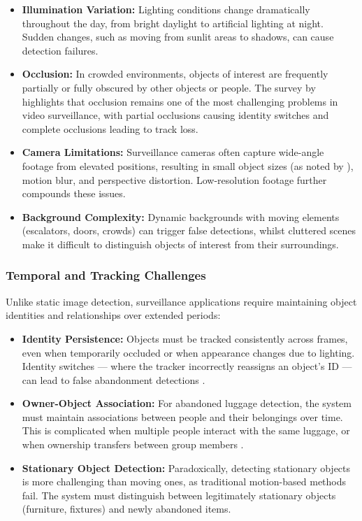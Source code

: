 \begin{itemize}
	\item \textbf{Illumination Variation:} Lighting conditions change
	      dramatically throughout the day, from bright daylight to artificial
	      lighting at night. Sudden changes, such as moving from sunlit areas to
	      shadows, can cause detection failures.
	\item \textbf{Occlusion:} In crowded environments, objects of interest are
	      frequently partially or fully obscured by other objects or people. The
	      survey by \citet{amrouch2024occlusion} highlights that occlusion
	      remains one of the most challenging problems in video surveillance,
	      with partial occlusions causing identity switches and complete
	      occlusions leading to track loss.
	\item \textbf{Camera Limitations:} Surveillance cameras often capture
	      wide-angle footage from elevated positions, resulting in small object
	      sizes (as noted by \citet{abandoned2025vrsalovic}), motion blur, and
	      perspective distortion. Low-resolution footage further compounds these
	      issues.
	\item \textbf{Background Complexity:} Dynamic backgrounds with moving
	      elements (escalators, doors, crowds) can trigger false detections,
	      whilst cluttered scenes make it difficult to distinguish objects of
	      interest from their surroundings.
\end{itemize}

\subsubsection{Temporal and Tracking Challenges}

Unlike static image detection, surveillance applications require maintaining
object identities and relationships over extended periods:

\begin{itemize}
	\item \textbf{Identity Persistence:} Objects must be tracked consistently
	      across frames, even when temporarily occluded or when appearance
	      changes due to lighting. Identity switches --- where the tracker
	      incorrectly reassigns an object's ID --- can lead to false abandonment
	      detections \citep{yilmaz2006object}.
	\item \textbf{Owner-Object Association:} For abandoned luggage detection,
	      the system must maintain associations between people and their
	      belongings over time. This is complicated when multiple people interact
	      with the same luggage, or when ownership transfers between group
	      members \citep{abandoned2025vrsalovic}.
	\item \textbf{Stationary Object Detection:} Paradoxically, detecting
	      stationary objects is more challenging than moving ones, as traditional
	      motion-based methods fail. The system must distinguish between
	      legitimately stationary objects (furniture, fixtures) and newly
	      abandoned items.
\end{itemize}

